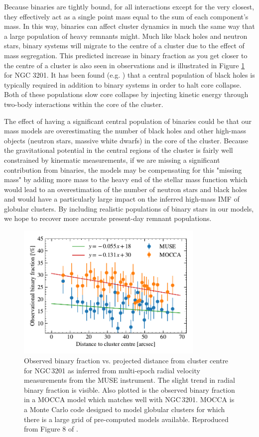 Because binaries are tightly bound, for all interactions except for the very closest, they
effectively act as a single point mass equal to the sum of each component's mass. In this way,
binaries can affect cluster dynamics in much the same way that a large population of heavy remnants
might. Much like black holes and neutron stars, binary systems will migrate to the centre of a
cluster due to the effect of mass segregation.  This predicted increase in binary fraction as you
get closer to the centre of a cluster is also seen in observations and is illustrated in Figure
\ref{fig:1/radial_binary_fraction} for NGC 3201. It has been found (e.g. \citealt{Kremer2019}) that
a central population of black holes is typically required in addition to binary systems in order to
halt core collapse. Both of these populations slow core collapse by injecting kinetic energy through
two-body interactions within the core of the cluster.

The effect of having a significant central population of binaries could be that our mass models are
overestimating the number of black holes and other high-mass objects (neutron stars, massive white
dwarfs) in the core of the cluster. Because the gravitational potential in the central regions of
the cluster is fairly well constrained by kinematic measurements, if we are missing a significant
contribution from binaries, the models may be compensating for this "missing mass" by adding more
mass to the heavy end of the stellar mass function which would lead to an overestimation of the
number of neutron stars and black holes and would have a particularly large impact on the inferred
high-mass IMF of globular clusters. By including realistic populations of binary stars in our
models, we hope to recover more accurate present-day remnant populations.

\begin{figure}
	\centering
	\includegraphics[width=0.8\textwidth]{figures/radial_binarity.pdf}
	\caption{Observed binary fraction vs. projected distance from cluster centre for NGC\,3201 as
		inferred from multi-epoch radial velocity measurements from the MUSE instrument.
		The slight trend in radial binary fraction is visible. Also plotted is the observed
		binary fraction in a MOCCA model which matches well with NGC\,3201. MOCCA is a Monte
		Carlo code designed to model globular clusters for which there is a large grid of
		pre-computed models available. Reproduced from Figure 8 of \citet{Giesers2019}.}
	\label{fig:1/radial_binary_fraction}
\end{figure}

